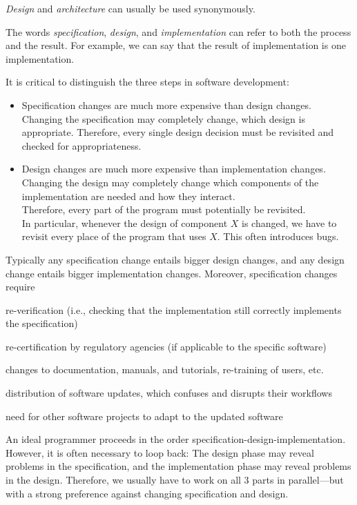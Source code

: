 \begin{terminology}
\emph{Design} and \emph{architecture} can usually be used synonymously.

The words \emph{specification}, \emph{design}, and \emph{implementation} can refer to both the process and the result.
For example, we can say that the result of implementation is one implementation.
\end{terminology}

It is critical to distinguish the three steps in software development:
\begin{itemize}
 \item Specification changes are much more expensive than design changes.
 Changing the specification may completely change, which design is appropriate.
 Therefore, every single design decision must be revisited and checked for appropriateness.
 \item Design changes are much more expensive than implementation changes.
 Changing the design may completely change which components of the implementation are needed and how they interact.\\
 Therefore, every part of the program must potentially be revisited. \\
 In particular, whenever the design of component $X$ is changed, we have to revisit every place of the program that uses $X$. 
 This often introduces bugs.
\end{itemize}
Typically any specification change entails bigger design changes, and any design change entails bigger implementation changes.
Moreover, specification changes require
\begin{compactitem}
	\item re-verification (i.e., checking that the implementation still correctly implements the specification)
	\item re-certification by regulatory agencies (if applicable to the specific software)
	\item changes to documentation, manuals, and tutorials, re-training of users, etc.
	\item distribution of software updates, which confuses and disrupts their workflows
	\item need for other software projects to adapt to the updated software
\end{compactitem}

An ideal programmer proceeds in the order specification-design-implementation.
However, it is often necessary to loop back: The design phase may reveal problems in the specification, and the implementation phase may reveal problems in the design.
Therefore, we usually have to work on all $3$ parts in parallel---but with a strong preference against changing specification and design.

